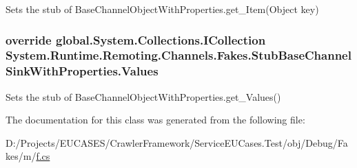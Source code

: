 Sets the stub of Base\-Channel\-Object\-With\-Properties.\-get\-\_\-\-Item(\-Object key)

\hypertarget{class_system_1_1_runtime_1_1_remoting_1_1_channels_1_1_fakes_1_1_stub_base_channel_sink_with_properties_aea17967b8f875386466c9edfc69797dd}{
\subsubsection[{Values}]{\setlength{\rightskip}{0pt plus 5cm}override global.\-System.\-Collections.\-I\-Collection System.\-Runtime.\-Remoting.\-Channels.\-Fakes.\-Stub\-Base\-Channel\-Sink\-With\-Properties.\-Values\hspace{0.3cm}{\ttfamily [get]}}}\label{class_system_1_1_runtime_1_1_remoting_1_1_channels_1_1_fakes_1_1_stub_base_channel_sink_with_properties_aea17967b8f875386466c9edfc69797dd}


Sets the stub of Base\-Channel\-Object\-With\-Properties.\-get\-\_\-\-Values()



The documentation for this class was generated from the following file\-:\begin{DoxyCompactItemize}
\item 
D\-:/\-Projects/\-E\-U\-C\-A\-S\-E\-S/\-Crawler\-Framework/\-Service\-E\-U\-Cases.\-Test/obj/\-Debug/\-Fakes/m/\hyperlink{m_2f_8cs}{f.\-cs}\end{DoxyCompactItemize}
